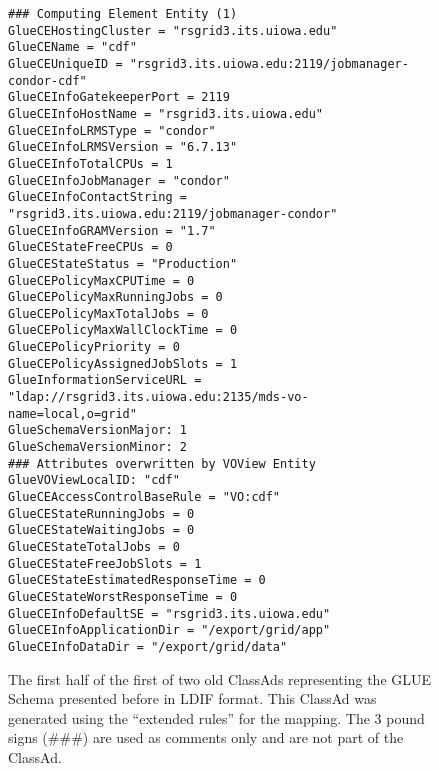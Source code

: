 \documentclass[12pt]{article}
\begin{document}
\begin{figure}
\scriptsize
\begin{verbatim}
### Computing Element Entity (1)
GlueCEHostingCluster = "rsgrid3.its.uiowa.edu"
GlueCEName = "cdf"
GlueCEUniqueID = "rsgrid3.its.uiowa.edu:2119/jobmanager-condor-cdf"
GlueCEInfoGatekeeperPort = 2119
GlueCEInfoHostName = "rsgrid3.its.uiowa.edu"
GlueCEInfoLRMSType = "condor"
GlueCEInfoLRMSVersion = "6.7.13"
GlueCEInfoTotalCPUs = 1
GlueCEInfoJobManager = "condor"
GlueCEInfoContactString = "rsgrid3.its.uiowa.edu:2119/jobmanager-condor"
GlueCEInfoGRAMVersion = "1.7"
GlueCEStateFreeCPUs = 0
GlueCEStateStatus = "Production"
GlueCEPolicyMaxCPUTime = 0
GlueCEPolicyMaxRunningJobs = 0
GlueCEPolicyMaxTotalJobs = 0
GlueCEPolicyMaxWallClockTime = 0
GlueCEPolicyPriority = 0
GlueCEPolicyAssignedJobSlots = 1
GlueInformationServiceURL = "ldap://rsgrid3.its.uiowa.edu:2135/mds-vo-name=local,o=grid"
GlueSchemaVersionMajor: 1
GlueSchemaVersionMinor: 2
### Attributes overwritten by VOView Entity
GlueVOViewLocalID: "cdf"
GlueCEAccessControlBaseRule = "VO:cdf"
GlueCEStateRunningJobs = 0
GlueCEStateWaitingJobs = 0
GlueCEStateTotalJobs = 0
GlueCEStateFreeJobSlots = 1
GlueCEStateEstimatedResponseTime = 0
GlueCEStateWorstResponseTime = 0
GlueCEInfoDefaultSE = "rsgrid3.its.uiowa.edu"
GlueCEInfoApplicationDir = "/export/grid/app"
GlueCEInfoDataDir = "/export/grid/data"
\end{verbatim}
\normalsize \caption[Example of an old ClassAd representation of the
GLUE Schema]{\label{CLASSAD-Extended-1-Example-part1} The first half
of the first of two old ClassAds representing the GLUE Schema
presented before in LDIF format. This ClassAd was generated using
the ``extended rules'' for the mapping. The 3 pound signs (\#\#\#)
are used as comments only and are not part of the ClassAd.}
\end{figure}
\end{document}
